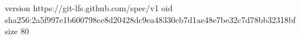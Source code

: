 version https://git-lfs.github.com/spec/v1
oid sha256:2a5f997e1b600798ce8d20428dc9ea48330cb7d1ae48e7be32c7d78bb32318bf
size 80
